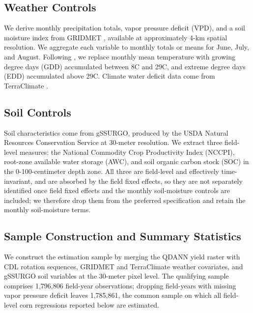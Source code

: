 \documentclass[12pt,letterpaper]{article}
\theoremstyle{remark}
\theoremstyle{remark}
\theoremstyle{plain}
\theoremstyle{definition}
\begin{document}
\subsection{\label{subsec:w_controls}Weather Controls}
We derive monthly precipitation totals, vapor pressure deficit (VPD), and a soil moisture index from GRIDMET \citep{Abatzoglou2013}, available at approximately 4-km spatial resolution. We aggregate each variable to monthly totals or means for June, July, and August. Following \citet{SchlenkerRoberts2009}, we replace monthly mean temperature with growing degree days (GDD) accumulated between 8\textdegree C and 29\textdegree C, and extreme degree days (EDD) accumulated above 29\textdegree C. Climate water deficit data come from TerraClimate \citep{Abatzoglou2018}.

\subsection{\label{subsec:soil_controls}Soil Controls}
Soil characteristics come from gSSURGO, produced by the USDA Natural Resources Conservation Service at 30-meter resolution. We extract three field-level measures: the National Commodity Crop Productivity Index (NCCPI), root-zone available water storage (AWC), and soil organic carbon stock (SOC) in the 0-100-centimeter depth zone. All three are field-level and effectively time-invariant, and are absorbed by the field fixed effects, so they are not separately identified once field fixed effects and the monthly soil-moisture controls are included; we therefore drop them from the preferred specification and retain the monthly soil-moisture terms.

\subsection{\label{subsec:smaple_const}Sample Construction and Summary Statistics}
We construct the estimation sample by merging the QDANN yield raster with CDL rotation sequences, GRIDMET and TerraClimate weather covariates, and gSSURGO soil variables at the 30-meter pixel level. The qualifying sample comprises 1,796,806 field-year observations; dropping field-years with missing vapor pressure deficit leaves 1,785,861, the common sample on which all field-level corn regressions reported below are estimated.


\vspace{-1ex}
\end{document}
